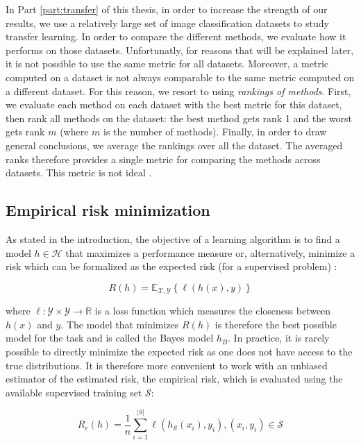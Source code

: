In Part \ref{part:transfer} of this thesis, in order to increase the strength of our results, we use a relatively large set of image classification datasets to study transfer learning. In order to compare the different methods, we evaluate how it performs on those datasets. Unfortunatly, for reasons that will be explained later, it is not possible to use the same metric for all datasets. Moreover, a metric computed on a dataset is not always comparable to the same metric computed on a different dataset. For this reason, we resort to using \textit{rankings of methods}. First, we evaluate each method on each dataset with the best metric for this dataset, then rank all methods on the dataset: the best method gets rank 1 and the worst gets rank $m$ (where $m$ is the number of methods). Finally, in order to draw general conclusions, we average the rankings over all the dataset. The averaged ranks therefore provides a single metric for comparing the methods across datasets. This metric is not ideal .
\subsection{Empirical risk minimization}
\label{ssec:backml:modelselection}
As stated in the introduction, the objective of a learning algorithm is to find a model $h \in \mathcal{H}$ that maximizes a performance measure or, alternatively, minimize a risk which can be formalized as the expected risk (for a supervised problem) \parencite{vapnik1992principles}:

\begin{equation}
\label{eqn:backml:expriskmin}
R(h) = \mathbb{E}_{\mathcal{X},\mathcal{Y}}\left\{\ell\left(h\left(x\right), y\right)\right\}
\end{equation}

where $\ell: \mathcal{Y}\times\mathcal{Y} \rightarrow \mathbb{R}$ is a loss function which measures the closeness between $h(x)$ and $y$. The model that minimizes $R(h)$ is therefore the best possible model for the task and is called the Bayes model $h_B$. In practice, it is rarely possible to directly minimize the expected risk as one does not have access to the true distributions. It is therefore more convenient to work with an unbiased estimator of the estimated risk, the empirical risk, which is evaluated using the available supervised training set $\mathcal{S}$:

\begin{equation}
\label{eqn:backml:empiricalrisk}
R_e(h) = \frac{1}{n} \sum_{i=1}^{|S|} \ell(h_\mathcal{S}(x_i), y_i), (x_i, y_i) \in \mathcal{S}
\end{equation}

